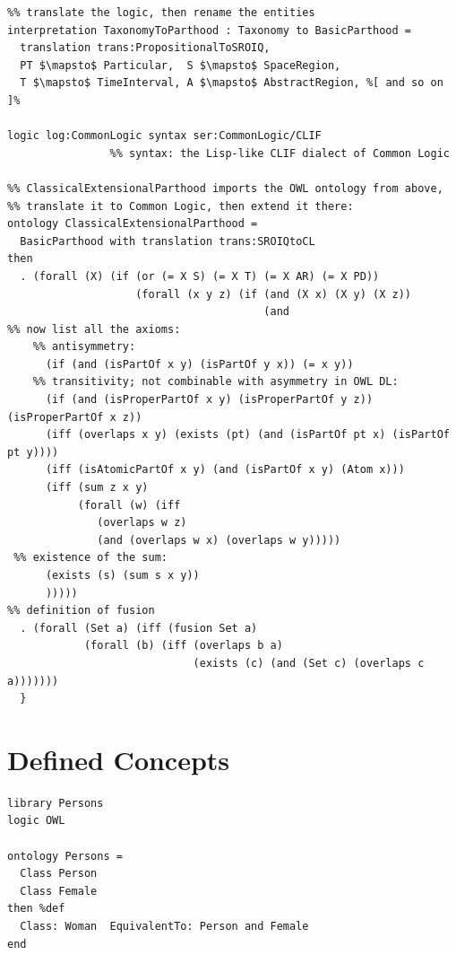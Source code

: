 \documentclass[10pt,fleqn,%
\ifpretendfinal
final%
\else
draft%
\fi,
]{scrreprt}
\newcommand{\sclause}[1]{\section{#1}}
\begin{document}
\begin{lstlisting}
%% translate the logic, then rename the entities
interpretation TaxonomyToParthood : Taxonomy to BasicParthood =
  translation trans:PropositionalToSROIQ,
  PT $\mapsto$ Particular,	S $\mapsto$ SpaceRegion, 
  T $\mapsto$ TimeInterval,	A $\mapsto$ AbstractRegion, %[ and so on ]%

logic log:CommonLogic syntax ser:CommonLogic/CLIF
                %% syntax: the Lisp-like CLIF dialect of Common Logic

%% ClassicalExtensionalParthood imports the OWL ontology from above, 
%% translate it to Common Logic, then extend it there:
ontology ClassicalExtensionalParthood =
  BasicParthood with translation trans:SROIQtoCL
then
  . (forall (X) (if (or (= X S) (= X T) (= X AR) (= X PD))
                    (forall (x y z) (if (and (X x) (X y) (X z))
                                        (and                          
%% now list all the axioms: 
	%% antisymmetry:
      (if (and (isPartOf x y) (isPartOf y x)) (= x y)) 
	%% transitivity; not combinable with asymmetry in OWL DL:
      (if (and (isProperPartOf x y) (isProperPartOf y z)) (isProperPartOf x z))
      (iff (overlaps x y) (exists (pt) (and (isPartOf pt x) (isPartOf pt y))))
      (iff (isAtomicPartOf x y) (and (isPartOf x y) (Atom x)))
      (iff (sum z x y)
           (forall (w) (iff 
		   	  (overlaps w z) 
			  (and (overlaps w x) (overlaps w y)))))
 %% existence of the sum:
      (exists (s) (sum s x y))                                          
      )))))
%% definition of fusion	  
  . (forall (Set a) (iff (fusion Set a)                                  
            (forall (b) (iff (overlaps b a)
                             (exists (c) (and (Set c) (overlaps c a)))))))
  }
\end{lstlisting}

\sclause{Defined Concepts}
\begin{lstlisting}[basicstyle=\ttfamily,language=dolText,morekeywords={props,ObjectProperty,Class,DisjointUnionOf,SubClassOf,Characteristics,Transitive,Asymmetric,SubPropertyOf,DisjointClasses,EquivalentTo,inverse,only,forall,iff,if,or,exists},escapechar=@,mathescape]
library Persons
logic OWL

ontology Persons =
  Class Person
  Class Female
then %def
  Class: Woman  EquivalentTo: Person and Female
end
\end{lstlisting}
\end{document}
